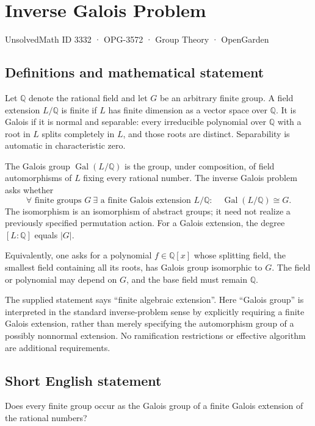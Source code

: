 \documentclass[11pt,a4paper]{article}
\begin{document}
\section*{Inverse Galois Problem}\label{3332}
{\small UnsolvedMath ID 3332 · OPG-3572 · Group Theory · OpenGarden}
\subsection{Definitions and mathematical statement}
Let $\mathbb Q$ denote the rational field and let $G$ be an arbitrary
finite group. A field extension $L/\mathbb Q$ is finite if $L$ has
finite dimension as a vector space over $\mathbb Q$. It is Galois
if it is normal and separable: every irreducible polynomial over
$\mathbb Q$ with a root in $L$ splits completely in $L$, and those
roots are distinct. Separability is automatic in characteristic zero.

The Galois group $\operatorname{Gal}(L/\mathbb Q)$ is the group,
under composition, of field automorphisms of $L$ fixing every
rational number. The inverse Galois problem asks whether
\[
 \forall\text{ finite groups }G\ \exists\text{ a finite Galois extension }
 L/\mathbb Q:\quad\operatorname{Gal}(L/\mathbb Q)\cong G.
\]
The isomorphism is an isomorphism of abstract groups; it need not
realize a previously specified permutation action. For a Galois
extension, the degree $[L:\mathbb Q]$ equals $|G|$.

Equivalently, one asks for a polynomial $f\in\mathbb Q[x]$ whose
splitting field, the smallest field containing all its roots, has
Galois group isomorphic to $G$. The field or polynomial may depend
on $G$, and the base field must remain $\mathbb Q$.

The supplied statement says ``finite algebraic extension''. Here
``Galois group'' is interpreted in the standard inverse-problem
sense by explicitly requiring a finite Galois extension, rather
than merely specifying the automorphism group of a possibly
nonnormal extension. No ramification restrictions or effective
algorithm are additional requirements.
\subsection{Short English statement}
Does every finite group occur as the Galois group of a finite Galois extension of the rational numbers?
\end{document}
